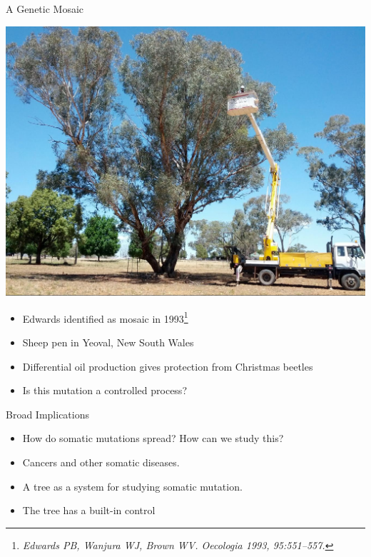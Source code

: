 \documentclass{beamer}
\begin{document}
\begin{frame}{A Genetic Mosaic}
	\begin{center}
	\includegraphics[width=.6\linewidth]{unlabeled_tree.jpg}
	\end{center}
	\begin{itemize}
		\item Edwards identified as mosaic in 1993\footnote{\textit{Edwards PB, Wanjura WJ, Brown WV. Oecologia 1993, 95:551–557.}}
		\item Sheep pen in Yeoval, New South Wales
		\item Differential oil production gives protection from Christmas beetles
		\item Is this mutation a controlled process?
	\end{itemize}
\end{frame}

\begin{frame}{Broad Implications}
	\begin{itemize}
	\item How do somatic mutations spread? How can we study this?
	\item Cancers and other somatic diseases.
	\item A tree as a system for studying somatic mutation.
	\item The tree has a built-in control
	\end{itemize}



\end{frame}
\end{document}
